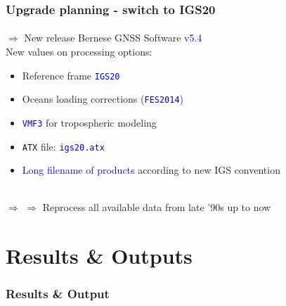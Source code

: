 \begin{frame}
  \frametitle{Upgrade planning - switch to IGS20}
  \framesubtitle{}
  \label{}
  $\Rightarrow$ New release Bernese GNSS Software \textcolor{blue}{v5.4}\\[1em]
  New values on processing options:
  \begin{itemize}\setlength\itemsep{.5em}
    \item Reference frame \texttt{\textcolor{blue}{IGS20}}
    \item Oceans loading corrections (\texttt{\textcolor{blue}{FES2014}})
    \item \texttt{\textcolor{blue}{VMF3}} for tropospheric modeling
    \item \texttt{ATX} file: \texttt{\textcolor{blue}{igs20.atx}}
    \item \textcolor{blue}{Long filename of products} according to new IGS convention
  \end{itemize}
  ~\\[.2em]
  $\Rightarrow$  
  $\Rightarrow$ Reprocess all available data from late '90s up to now
\end{frame}
\note{}

\section{Results \& Outputs}

{
\vskip-1.5cm
\begin{frame}\frametitle{Results \& Output}\framesubtitle{}
\begin{center}
\vskip -1.6cm
\end{center}
\end{frame}
}

